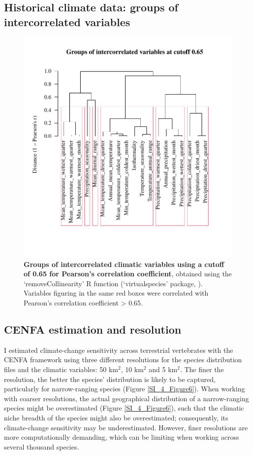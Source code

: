 \subsection{Historical climate data: groups of intercorrelated variables}
\begin{figure}[h!]
\centering
\includegraphics[scale=0.9, trim={0 1.75cm 0 2cm},clip]{Supporting/Chapter4/Figures/ClimVars_groups2}
\caption[Groups of intercorrelated climatic variables using a cutoff of 0.65 for Pearson's correlation coefficient]{\textbf{Groups of intercorrelated climatic variables using a cutoff of 0.65 for Pearson's correlation coefficient}, obtained using the `removeCollinearity' R function (`virtualspecies' package, \citet{virtualspecies}). Variables figuring in the same red boxes were correlated with Pearson's correlation coefficient > 0.65.}
\label{SI_4_Figure5}
\end{figure}


\subsection{CENFA estimation and resolution}
I estimated climate-change sensitivity across terrestrial vertebrates with the CENFA framework using three different resolutions for the species distribution files and the climatic variables: 50 km$^2$, 10 km$^2$ and 5 km$^2$. The finer the resolution, the better the species' distribution is likely to be captured, particularly for narrow-ranging species (Figure \ref{SI_4_Figure6}). When working with coarser resolutions, the actual geographical distribution of a narrow-ranging species might be overestimated (Figure \ref{SI_4_Figure6}), such that the climatic niche breadth of the species might also be overestimated; consequently, its climate-change sensitivity may be underestimated. However, finer resolutions are more computationally demanding, which can be limiting when working across several thousand species. 

